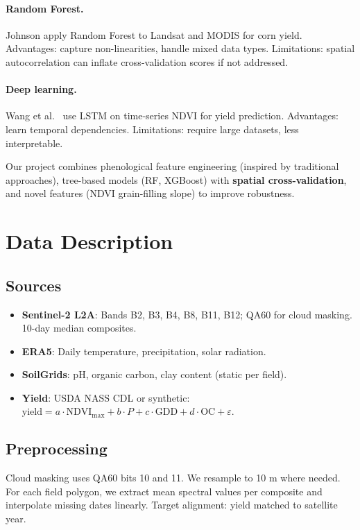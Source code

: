 \documentclass[conference]{IEEEtran}
\begin{document}
\paragraph{Random Forest.} Johnson \cite{johnson2016predicting} apply Random Forest to Landsat and MODIS for corn yield. Advantages: capture non-linearities, handle mixed data types. Limitations: spatial autocorrelation can inflate cross-validation scores if not addressed.

\paragraph{Deep learning.} Wang et al.~\cite{wang2020deep} use LSTM on time-series NDVI for yield prediction. Advantages: learn temporal dependencies. Limitations: require large datasets, less interpretable.

Our project combines phenological feature engineering (inspired by traditional approaches), tree-based models (RF, XGBoost) with \textbf{spatial cross-validation}, and novel features (NDVI grain-filling slope) to improve robustness.

\section{Data Description}
\label{sec:data}

\subsection{Sources}
\begin{itemize}
  \item \textbf{Sentinel-2 L2A}: Bands B2, B3, B4, B8, B11, B12; QA60 for cloud masking. 10-day median composites.
  \item \textbf{ERA5}: Daily temperature, precipitation, solar radiation.
  \item \textbf{SoilGrids}: pH, organic carbon, clay content (static per field).
  \item \textbf{Yield}: USDA NASS CDL or synthetic: $\text{yield} = a \cdot \text{NDVI}_{\max} + b \cdot P + c \cdot \text{GDD} + d \cdot \text{OC} + \varepsilon$.
\end{itemize}

\subsection{Preprocessing}
Cloud masking uses QA60 bits 10 and 11. We resample to 10 m where needed. For each field polygon, we extract mean spectral values per composite and interpolate missing dates linearly. Target alignment: yield matched to satellite year.
\end{document}
